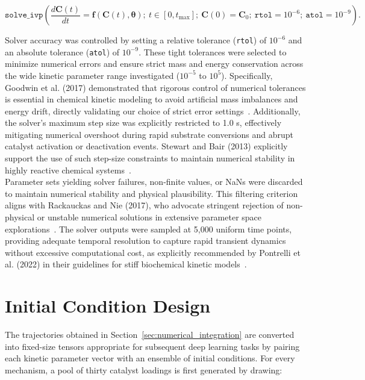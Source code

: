 \documentclass{dissertation}
\begin{document}
\begin{equation}
\texttt{solve\_ivp}\left(\frac{d\mathbf{C}(t)}{dt} = \mathbf{f}(\mathbf{C}(t), \boldsymbol{\theta});\ 
t \in [0, t_{\max}];\ 
\mathbf{C}(0) = \mathbf{C}_0;\ \texttt{rtol}=10^{-6};\ \texttt{atol}=10^{-9} \right).
\end{equation}

Solver accuracy was controlled by setting a relative tolerance (\texttt{rtol}) of $10^{-6}$ and an absolute tolerance (\texttt{atol}) of $10^{-9}$. These tight tolerances were selected to minimize numerical errors and ensure strict mass and energy conservation across the wide kinetic parameter range investigated ($10^{-5}$ to $10^{5}$). Specifically, Goodwin et al. (2017) demonstrated that rigorous control of numerical tolerances is essential in chemical kinetic modeling to avoid artificial mass imbalances and energy drift, directly validating our choice of strict error settings~\cite{Goodwin2017}. Additionally, the solver’s maximum step size was explicitly restricted to 1.0 s, effectively mitigating numerical overshoot during rapid substrate conversions and abrupt catalyst activation or deactivation events. Stewart and Bair (2013) explicitly support the use of such step-size constraints to maintain numerical stability in highly reactive chemical systems~\cite{Stewart2013}.\\

Parameter sets yielding solver failures, non-finite values, or NaNs  were discarded to maintain numerical stability and physical plausibility. This filtering criterion aligns with Rackauckas and Nie (2017), who advocate stringent rejection of non-physical or unstable numerical solutions in extensive parameter space explorations~\cite{Rackauckas2017}. The solver outputs were sampled at 5,000 uniform time points, providing adequate temporal resolution to capture rapid transient dynamics without excessive computational cost, as explicitly recommended by Pontrelli et al. (2022) in their guidelines for stiff biochemical kinetic models~\cite{Pontrelli2022}.

\section{Initial Condition Design}
\label{sec:initial_condition_design}

The trajectories obtained in Section~\ref{sec:numerical_integration} are converted into fixed-size tensors appropriate for subsequent deep learning tasks by pairing each kinetic parameter vector with an ensemble of initial conditions. For every mechanism, a pool of thirty catalyst loadings is first generated by drawing:
\end{document}
